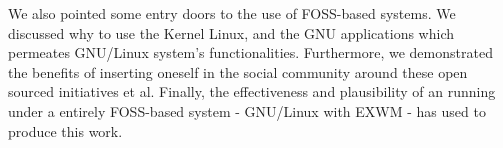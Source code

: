 \documentclass[
12pt,				%
openright,			%
oneside,			%
a4paper,			%
brazil,				%
english,			%
]{abntex2}
\begin{document}
We also pointed some entry doors to the use of FOSS-based systems. We
discussed why to use the Kernel Linux, and the GNU applications which
permeates GNU/Linux system's functionalities. Furthermore, we demonstrated
the benefits of inserting oneself in the social community around these
open sourced initiatives et al. Finally, the effectiveness and
plausibility of an running under a entirely FOSS-based system -
GNU/Linux with EXWM - has used to produce this work. 


\end{document}
